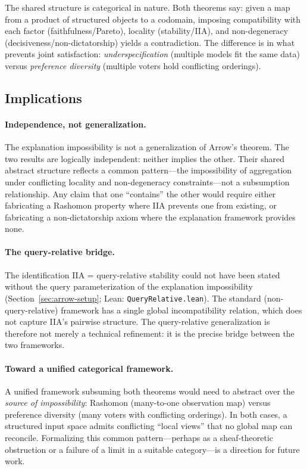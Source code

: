 The shared structure is categorical in nature. Both theorems say:
given a map from a product of structured objects to a codomain,
imposing compatibility with each factor (faithfulness/Pareto),
locality (stability/IIA), and non-degeneracy
(decisiveness/non-dictatorship) yields a contradiction. The
difference is in what prevents joint satisfaction:
\emph{underspecification} (multiple models fit the same data) versus
\emph{preference diversity} (multiple voters hold conflicting
orderings).

\subsection{Implications}
\label{sec:arrow-implications}

\paragraph{Independence, not generalization.}
The explanation impossibility is not a generalization of Arrow's
theorem. The two results are logically independent: neither implies
the other. Their shared abstract structure reflects a common
pattern---the impossibility of aggregation under conflicting
locality and non-degeneracy constraints---not a subsumption
relationship. Any claim that one ``contains'' the other would require
either fabricating a Rashomon property where IIA prevents one from
existing, or fabricating a non-dictatorship axiom where the
explanation framework provides none.

\paragraph{The query-relative bridge.}
The identification IIA = query-relative stability could not have been
stated without the query parameterization of the explanation
impossibility (Section~\ref{sec:arrow-setup};
Lean: \texttt{QueryRelative.lean}). The standard
(non-query-relative) framework has a single global incompatibility
relation, which does not capture IIA's pairwise structure. The
query-relative generalization is therefore not merely a technical
refinement: it is the precise bridge between the two frameworks.

\paragraph{Toward a unified categorical framework.}
A unified framework subsuming both theorems would need to abstract
over the \emph{source of impossibility}: Rashomon (many-to-one
observation map) versus preference diversity (many voters with
conflicting orderings). In both cases, a structured input space
admits conflicting ``local views'' that no global map can reconcile.
Formalizing this common pattern---perhaps as a sheaf-theoretic
obstruction or a failure of a limit in a suitable category---is a
direction for future work.

